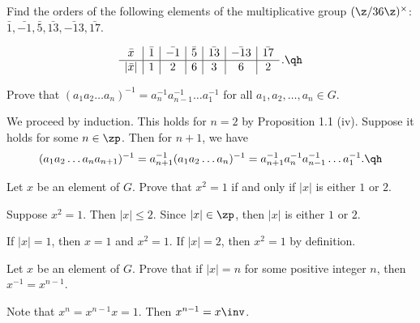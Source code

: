 \begin{exercise}\label{ex1.1.14}
    Find the orders of the following elements of the multiplicative group $(\z/36\z)^{\times}$: $\bar{1}, \bar{-1}, \bar{5}, \bar{13}, \bar{-13}, \bar{17}$.
\end{exercise}

\begin{sol}
    \[\begin{array}{c|c|c|c|c|c|c}
        \bar x & \bar 1 & \bar{-1} & \bar 5 & \bar{13} & \bar{-13} & \bar{17} \\
        \hline
        |\bar x| & 1 & 2 & 6 & 3 & 6 & 2
    \end{array}\,. \qh\]
\end{sol}

\begin{exercise}\label{ex1.1.15}
    Prove that $(a_1 a_2 \ldots a_n)^{-1} = a_n^{-1} a_{n-1}^{-1} \ldots a_1^{-1}$ for all $a_1, a_2, \ldots, a_n \in G$.
\end{exercise}

\begin{sol}
    We proceed by induction. This holds for $n = 2$ by Proposition 1.1 (iv). Suppose it holds for some $n \in \zp$. Then for $n + 1$, we have
    \[(a_1 a_2 \ldots a_n a_{n+1})^{-1} = a_{n+1}^{-1} (a_1 a_2 \ldots a_n)^{-1} = a_{n+1}^{-1} a_n^{-1} a_{n-1}^{-1} \ldots a_1^{-1}. \qh\]
\end{sol}

\begin{exercise}\label{ex1.1.16}
    Let $x$ be an element of $G$. Prove that $x^2 = 1$ if and only if $|x|$ is either $1$ or $2$.
\end{exercise}

\begin{solitem}
    \item[\rightimp] Suppose $x^2 = 1$. Then $|x| \leq 2$. Since $|x| \in \zp$, then $|x|$ is either $1$ or $2$.
    \item[\leftimp] If $|x| = 1$, then $x = 1$ and $x^2 = 1$. If $|x| = 2$, then $x^2 = 1$ by definition. \qh
\end{solitem}

\begin{exercise}\label{ex1.1.17}
    Let $x$ be an element of $G$. Prove that if $|x| = n$ for some positive integer $n$, then $x^{-1} = x^{n-1}$.
\end{exercise}

\begin{sol}
    Note that $x^n = x^{n - 1}x = 1$. Then $x^{n - 1} = x\inv$.
\end{sol}

